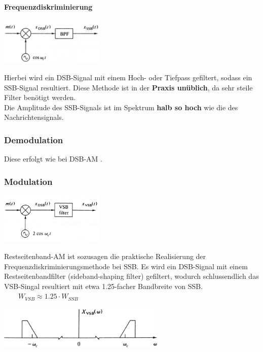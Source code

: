 \textbf{Frequenzdiskriminierung} \\
\begin{minipage}[t][2cm][c]{5.5cm}
    \includegraphics[width=5cm]{bilder/am_ssb_modulationFilter.png}
\end{minipage}
\begin{minipage}[t][2cm][c]{12.5cm}	
	Hierbei wird ein DSB-Signal mit einem Hoch- oder Tiefpass gefiltert, sodass ein SSB-Signal
	resultiert. Diese Methode ist in der \textbf{Praxis unüblich}, da sehr steile Filter benötigt
	werden.\\
	Die Amplitude des SSB-Signals ist im Spektrum \textbf{halb so hoch} wie die des
	Nachrichtensignals.
\end{minipage}

\subsubsection{Demodulation}
Diese erfolgt wie bei DSB-AM .\\


\subsubsection{Modulation}
\begin{minipage}[t][2.2cm][c]{5.5cm}
    \includegraphics[width=5cm]{bilder/am_vsb_modulator.png}
\end{minipage}
\begin{minipage}[t][2.2cm][c]{12.5cm}	
Restseitenband-AM ist sozusagen die praktische Realisierung der Frequenzdiskriminierungsmethode bei
SSB. Es wird ein DSB-Signal mit einem Restseitenbandfilter (sideband-shaping filter) gefiltert,
wodurch schlussendlich das VSB-Singal resultiert mit etwa 1.25-facher Bandbreite von SSB.
$ \qquad  W_{VSB} \approx 1.25 \cdot W_{SSB} $
\end{minipage}
\begin{center}
    \includegraphics[width=8cm]{bilder/am_vsb_spektrum.png}
\end{center}

